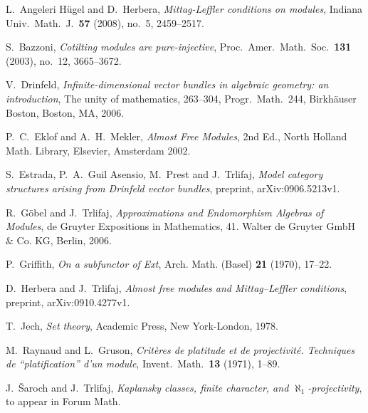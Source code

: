 \documentclass[a4paper,11pt]{amsart}
\theoremstyle{plain}
\theoremstyle{definition}
\theoremstyle{remark}
\begin{document}

\begin{thebibliography}{999}
	L.\ Angeleri H\"ugel and D.\ Herbera,
	\emph{Mittag-Leffler conditions on modules},
	Indiana Univ.\ Math.\ J.\ \textbf{57} (2008), no.\ 5, 2459--2517.

	S.\ Bazzoni,
	\emph{Cotilting modules are pure-injective},
	Proc.\ Amer.\ Math.\ Soc.\ \textbf{131} (2003), no.\ 12, 3665--3672.

	V.\ Drinfeld,
	\emph{Infinite-dimensional vector bundles in algebraic geometry: an introduction},
	The unity of mathematics, 263--304, Progr.\ Math.\ 244, Birkh\"auser Boston, Boston, MA, 2006.

P.\ C.\ Eklof and A.\ H.\ Mekler, \emph{Almost Free Modules}, 2nd Ed., North Holland Math. Library, Elsevier, Amsterdam 2002.

	S.\ Estrada, P.\ A.\ Guil Asensio, M.\ Prest and J.\ Trlifaj,
	\emph{Model category structures arising from Drinfeld vector bundles},
	preprint, arXiv:0906.5213v1.

	R.\ G\"obel and J.\ Trlifaj,
	\emph{Approximations and Endomorphism Algebras of Modules},
	de Gruyter Expositions in Mathematics, 41. Walter de Gruyter GmbH \& Co. KG, Berlin, 2006.

	P.\ Griffith,
	\emph{On a subfunctor of Ext},
	Arch. Math. (Basel) \textbf{21} (1970), 17--22.

	D.\ Herbera and J.\ Trlifaj,
	\emph{Almost free modules and Mittag--Leffler conditions},
	preprint, arXiv:0910.4277v1.

  T.\ Jech,
  \emph{Set theory},
  Academic Press, New York-London, 1978.
  
	M.\ Raynaud and L.\ Gruson,
	\emph{Crit\`eres de platitude et de projectivit\'e. Techniques de ``platification'' d'un module},
	Invent.\ Math.\ \textbf{13} (1971), 1--89.

	J.\ \v{S}aroch and J.\ Trlifaj,
	\emph{Kaplansky classes, finite character, and $\aleph_1$-projectivity},
	to appear in Forum Math.
\end{thebibliography}
\end{document}
